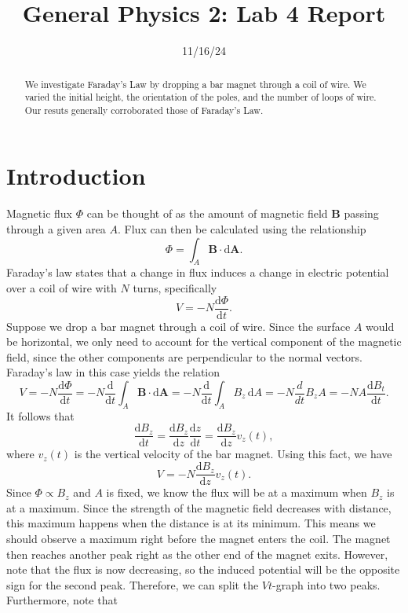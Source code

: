 \documentclass[11pt, letterpaper]{report}
\title{General Physics 2: Lab 4 Report}
\date{11/16/24}
\begin{document}
\maketitle
\begin{abstract}
	We investigate Faraday's Law by dropping a bar magnet through a coil of wire. We varied the initial height, the orientation of the poles, and the number of loops of wire. Our resuts generally corroborated those of Faraday's Law.
\end{abstract}
\section{Introduction}
Magnetic flux $\Phi $ can be thought of as the amount of magnetic field $\mathbf{B}$ passing through a given area $A$. Flux can then be calculated using the relationship
\begin{equation}\label{eq:1}
	\Phi =\int_{A}\mathbf{B}\cdot  \mathrm{d} \mathbf{A}
.\end{equation}
Faraday's law states that a change in flux induces a change in electric potential over a coil of wire with $N$ turns, specifically
\begin{equation}\label{eq:2}
	V=-N \frac{\mathrm{d}\Phi }{\mathrm{d}t} 
.\end{equation}
Suppose we drop a bar magnet through a coil of wire. Since the surface $A$ would be horizontal, we only need to account for the vertical component of the magnetic field, since the other components are perpendicular to the normal vectors. Faraday's law in this case yields the relation
\[
	V=-N\frac{\mathrm{d}\Phi }{\mathrm{d}t} =-N\frac{\mathrm{d}}{\mathrm{d}t} \int_{A} \mathbf{B}\cdot \mathrm{d} \mathbf{A}=-N\frac{\mathrm{d}}{\mathrm{d}t} \int_{A} B_z\,\mathrm{d} A=-N\frac{d}{dt}B_zA=-NA \frac{\mathrm{d}B_t}{\mathrm{d}t} 
.\]
It follows that
\[
	\frac{\mathrm{d}B_z}{\mathrm{d}t} =\frac{\mathrm{d}B_z}{\mathrm{d}z} \frac{\mathrm{d}z}{\mathrm{d}t} =\frac{\mathrm{d}B_z}{\mathrm{d}z} v_z(t)
,\]
where $v_z(t)$ is the vertical velocity of the bar magnet. Using this fact, we have
\begin{equation}\label{eq:3}
	V=-N \frac{\mathrm{d}B_z}{\mathrm{d}z} v_z(t)
.\end{equation}
Since $\Phi \propto B_z$ and $A$ is fixed, we know the flux will be at a maximum when $B_z$ is at a maximum. Since the strength of the magnetic field decreases with distance, this maximum happens when the distance is at its minimum. This means we should observe a maximum right before the magnet enters the coil. The magnet then reaches another peak right as the other end of the magnet exits. However, note that the flux is now decreasing, so the induced potential will be the opposite sign for the second peak. Therefore, we can split the $Vt$-graph into two peaks. Furthermore, note that
\end{document}
